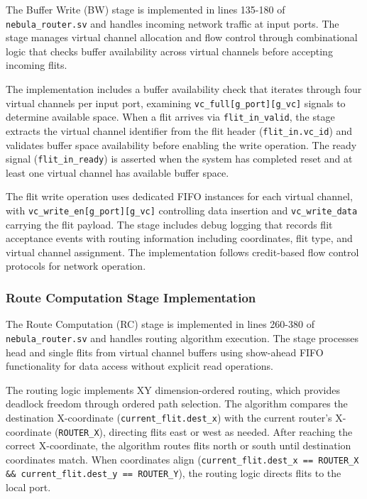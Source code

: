 \documentclass[12pt,letterpaper]{article}
\begin{document}
The Buffer Write (BW) stage is implemented in lines 135-180 of \texttt{nebula\_router.sv} and handles incoming network traffic at input ports. The stage manages virtual channel allocation and flow control through combinational logic that checks buffer availability across virtual channels before accepting incoming flits.

The implementation includes a buffer availability check that iterates through four virtual channels per input port, examining \texttt{vc\_full[g\_port][g\_vc]} signals to determine available space. When a flit arrives via \texttt{flit\_in\_valid}, the stage extracts the virtual channel identifier from the flit header (\texttt{flit\_in.vc\_id}) and validates buffer space availability before enabling the write operation. The ready signal (\texttt{flit\_in\_ready}) is asserted when the system has completed reset and at least one virtual channel has available buffer space.

The flit write operation uses dedicated FIFO instances for each virtual channel, with \texttt{vc\_write\_en[g\_port][g\_vc]} controlling data insertion and \texttt{vc\_write\_data} carrying the flit payload. The stage includes debug logging that records flit acceptance events with routing information including coordinates, flit type, and virtual channel assignment. The implementation follows credit-based flow control protocols for network operation.

\subsubsection{Route Computation Stage Implementation}

The Route Computation (RC) stage is implemented in lines 260-380 of \texttt{nebula\_router.sv} and handles routing algorithm execution. The stage processes head and single flits from virtual channel buffers using show-ahead FIFO functionality for data access without explicit read operations.

The routing logic implements XY dimension-ordered routing, which provides deadlock freedom through ordered path selection. The algorithm compares the destination X-coordinate (\texttt{current\_flit.dest\_x}) with the current router's X-coordinate (\texttt{ROUTER\_X}), directing flits east or west as needed. After reaching the correct X-coordinate, the algorithm routes flits north or south until destination coordinates match. When coordinates align (\texttt{current\_flit.dest\_x == ROUTER\_X \&\& current\_flit.dest\_y == ROUTER\_Y}), the routing logic directs flits to the local port.
\end{document}
